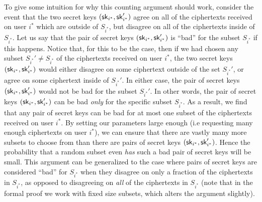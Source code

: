To give some intuition for why this counting argument should work,
consider the event that the two secret keys \((\mathsf{sk}_{i^{*}},\mathsf{sk}_{i^{*}}')\)
agree on all of the ciphertexts received on user \(i^{*}\)
which are outside of \(S_{i^{*}}\),
but disagree on all of the ciphertexts inside of \(S_{i^{*}}\).
Let us say that the pair of secret keys \((\mathsf{sk}_{i^{*}},\mathsf{sk}_{i^{*}}')\)
is ``bad'' for the subset \(S_{i^{*}}\) if this happens.
Notice that, for this to be the case,
then if we had chosen any subset \(S_{i^{*}}' \ne S_{i^{*}}\) of the ciphertexts received on user \(i^{*}\),
the two secret keys \((\mathsf{sk}_{i^{*}},\mathsf{sk}_{i^{*}}')\)
would either disagree on some ciphertext outside of the set \(S_{i^{*}}'\),
or agree on some ciphertext inside of \(S_{i^{*}}'\).
In either case, the pair of secret keys \((\mathsf{sk}_{i^{*}},\mathsf{sk}_{i^{*}}')\)
would not be bad for the subset \(S_{i^{*}}'\).
In other words, the pair of secret keys \((\mathsf{sk}_{i^{*}},\mathsf{sk}_{i^{*}}')\)
can be bad \emph{only} for the specific subset \(S_{i^{*}}\).
As a result, we find that any pair of secret keys can be
bad for at most one subset of the ciphertexts received on user \(i^{*}\).
By setting our parameters large enough
(i.e requesting many enough ciphertexts on user \(i^{*}\)),
we can ensure that there are vastly many more subsets to choose from
than there are pairs of secret keys \((\mathsf{sk}_{i^{*}},\mathsf{sk}_{i^{*}}')\).
Hence the probability that a random subset even \emph{has}
such a bad pair of secret keys will be small.
This argument can be generalized to the case where pairs of
secret keys are considered ``bad'' for \(S_{i^{*}}\)
when they disagree on only a fraction of the ciphertexts in \(S_{i^{*}}\),
as opposed to disagreeing on \emph{all} of the ciphertexts in \(S_{i^{*}}\)
(note that in the formal proof we work with fixed size subsets,
which alters the argument slightly).


